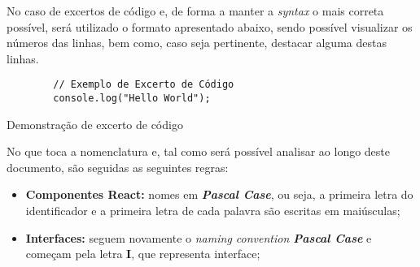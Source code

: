 No caso de excertos de código e, de forma a manter a \textit{syntax} o mais correta possível, será utilizado o formato apresentado abaixo, sendo possível visualizar os números das linhas, bem como, caso seja pertinente, destacar alguma destas linhas.

\vspace{0.01cm}

\begin{longlisting}
	\begin{verbatim}
		// Exemplo de Excerto de Código
		console.log("Hello World");
	\end{verbatim}
	\caption{Demonstração de excerto de código}
\end{longlisting}

\vspace{0.1cm}

No que toca a nomenclatura e, tal como será possível analisar ao longo deste documento, são seguidas as seguintes regras:

\begin{itemize}
	\item \textbf{Componentes React:} nomes em \textit{\textbf{Pascal Case}}, ou seja, a primeira letra do identificador e a primeira letra de cada palavra são escritas em maiúsculas;
	\item \textbf{Interfaces:} seguem novamente o \textit{naming convention \textbf{Pascal Case}} e começam pela letra \textbf{I}, que representa interface;
\end{itemize}